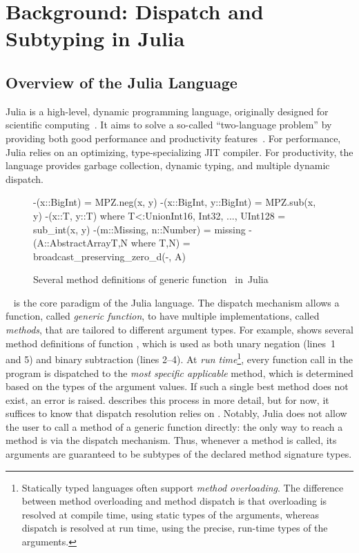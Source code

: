 \chapter{Background: Dispatch and Subtyping in Julia}\label{chap:2}

\section{Overview of the Julia Language}

Julia is a high-level, dynamic programming language, originally designed 
for scientific computing~\cite{TODO}.
It aims to solve a so-called ``two-language problem''
by providing both good performance and productivity features~\cite{TODO}.
For performance, Julia relies on an optimizing, type-specializing JIT compiler.
For productivity, the language provides garbage collection, dynamic typing, and
multiple dynamic dispatch.

\begin{figure}[t]
\begin{julia}
-(x::BigInt) = MPZ.neg(x, y)
-(x::BigInt, y::BigInt) = MPZ.sub(x, y)
-(x::T, y::T) where T<:Union{Int16, Int32, ..., UInt128} = sub_int(x, y)
-(m::Missing, n::Number) = missing
-(A::AbstractArray{T,N} where {T,N}) = broadcast_preserving_zero_d(-, A)
\end{julia}
\caption{Several method definitions of generic function~\cjl{(-)}
in~Julia}\label{fig:code:subtraction}
\end{figure}

~\cite{TODO} is the core paradigm of the Julia
language. The dispatch mechanism allows a function, called \emph{generic
function}, to have multiple implementations, called \emph{methods}, that are
tailored to different argument types. For example, 
shows several method definitions of function \cjl{(-)},
which is used as both unary negation (lines~1 and 5)
and binary subtraction (lines 2--4).
At \emph{run time}\footnote{Statically typed languages often support
\emph{method overloading}. The difference between method overloading and method
dispatch is that overloading is resolved at compile time, using static types of
the arguments, whereas dispatch is resolved at run time, using the precise,
run-time types of the arguments.},
every function call in the program is dispatched to the
\emph{most specific applicable} method, which is determined based on the
types of the argument values. If such a single best method does not exist,
an error is raised.
 describes this process in more detail, but for now,
it suffices to know that dispatch resolution relies on .
Notably, Julia does not allow the user to call a method of a generic function
directly: the only way to reach a method is via the dispatch mechanism.
Thus, whenever a method is called, its arguments are guaranteed to be
subtypes of the declared method signature types.

